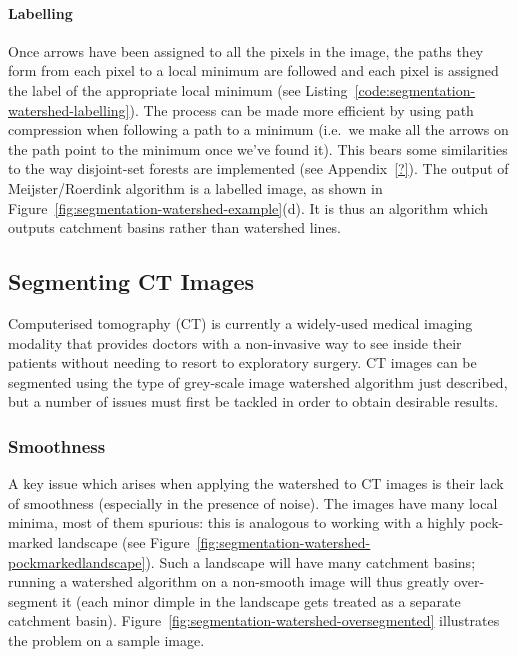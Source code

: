 \paragraph{Labelling}

Once arrows have been assigned to all the pixels in the image, the paths they form from each pixel to a local minimum are followed and each pixel is assigned the label of the appropriate local minimum (see Listing~\ref{code:segmentation-watershed-labelling}). The process can be made more efficient by using path compression when following a path to a minimum (i.e.~we make all the arrows on the path point to the minimum once we've found it). This bears some similarities to the way disjoint-set forests are implemented (see Appendix~\ref{?}). The output of Meijster/Roerdink algorithm is a labelled image, as shown in Figure~\ref{fig:segmentation-watershed-example}(d). It is thus an algorithm which outputs catchment basins rather than watershed lines.

\subsection{Segmenting CT Images}
\label{subsec:segmentation-watershed-ct}

Computerised tomography (CT) is currently a widely-used medical imaging modality \cite{garvey02} that provides doctors with a non-invasive way to see inside their patients without needing to resort to exploratory surgery. CT images can be segmented using the type of grey-scale image watershed algorithm just described, but a number of issues must first be tackled in order to obtain desirable results.

\subsubsection{Smoothness}

A key issue which arises when applying the watershed to CT images is their lack of smoothness (especially in the presence of noise). The images have many local minima, most of them spurious: this is analogous to working with a highly pock-marked landscape (see Figure~\ref{fig:segmentation-watershed-pockmarkedlandscape}). Such a landscape will have many catchment basins; running a watershed algorithm on a non-smooth image will thus greatly over-segment it (each minor dimple in the landscape gets treated as a separate catchment basin). Figure~\ref{fig:segmentation-watershed-oversegmented} illustrates the problem on a sample image.

